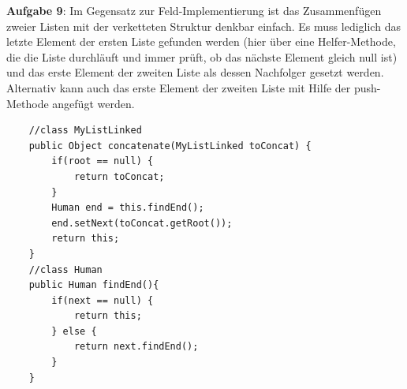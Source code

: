 \documentclass{article}
\begin{document}
\textbf{Aufgabe 9}:
Im Gegensatz zur Feld-Implementierung ist das Zusammenfügen zweier Listen mit der 
verketteten Struktur denkbar einfach. Es muss lediglich das letzte Element der ersten 
Liste gefunden werden (hier über eine Helfer-Methode, die die Liste durchläuft und 
immer prüft, ob das nächste Element gleich null ist) und das erste Element der zweiten Liste
als dessen Nachfolger gesetzt werden. Alternativ kann auch das erste Element der zweiten Liste mit 
Hilfe der push-Methode angefügt werden. 
\begin{verbatim}
    //class MyListLinked
    public Object concatenate(MyListLinked toConcat) {
        if(root == null) {
            return toConcat;
        }
        Human end = this.findEnd();
        end.setNext(toConcat.getRoot());
        return this;
    }
    //class Human
    public Human findEnd(){
        if(next == null) {
            return this;
        } else {
            return next.findEnd();
        }
    }
\end{verbatim}
\end{document}
